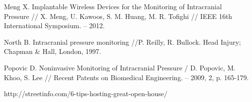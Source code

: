 \newpage

  
\begin{thebibliography}{99}

{}\label{literatura}


Meng X. Implantable Wireless Devices for the Monitoring of Intracranial 
Pressure // X. Meng, U. Kawoos, S. M. Huang, M. R. Tofighi // IEEE 16th International Symposium. -- 2012.


North B. Intracranial pressure monitoring //P. Reilly, R. Bullock. Head Injury; Chapman \& Hall, London, 1997.

Popovic D. Noninvasive Monitoring of Intracranial Pressure / D. Popovic, M. Khoo, S. Lee // Recent Patents on Biomedical Engineering. -- 2009, 2, p. 165-179.

http://streetinfo.com/6-tips-hosting-great-open-house/

\end{thebibliography}
